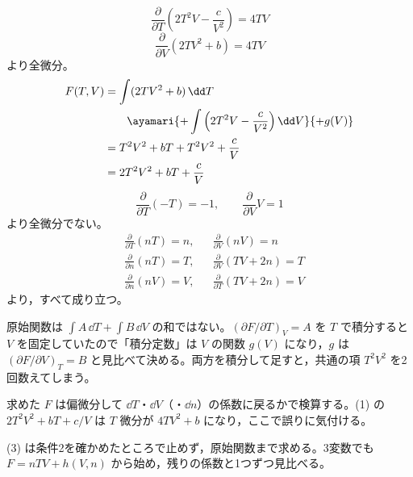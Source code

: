 \[ \frac{\partial}{\partial T}\left(2T^{2}V-\frac{c}{V^{2}}\right)=4TV \]
\[ \frac{\partial}{\partial V}(2TV^{2}+b)=4TV \]
より全微分。
\begin{align*}
F(T,V)&=\int(2TV^{2}+b)\,\dd T\\
&\qquad\ayamari{+\int\left(2T^{2}V-\frac{c}{V^{2}}\right)\dd V}{+g(V)}\\
&=T^{2}V^{2}+bT+T^{2}V^{2}+\frac{c}{V}\\
&=2T^{2}V^{2}+bT+\frac{c}{V}
\end{align*}
\[ \frac{\partial}{\partial T}(-T)=-1, \qquad \frac{\partial}{\partial V}V=1 \]
より全微分でない。
\begin{align*}
&\frac{\partial}{\partial T}(nT)=n, && \frac{\partial}{\partial V}(nV)=n\\
&\frac{\partial}{\partial n}(nT)=T, && \frac{\partial}{\partial V}(TV+2n)=T\\
&\frac{\partial}{\partial n}(nV)=V, && \frac{\partial}{\partial T}(TV+2n)=V
\end{align*}
より，すべて成り立つ。
\item 原始関数は $\int A\,\dd T+\int B\,\dd V$ の和ではない。$(\partial F/\partial T)_{V}=A$ を $T$ で積分すると $V$ を固定していたので「積分定数」は $V$ の関数 $g(V)$ になり，$g$ は $(\partial F/\partial V)_{T}=B$ と見比べて決める。両方を積分して足すと，共通の項 $T^{2}V^{2}$ を2回数えてしまう。
\item 求めた $F$ は偏微分して $\dd T$・$\dd V$（・$\dd n$）の係数に戻るかで検算する。(1) の $2T^{2}V^{2}+bT+c/V$ は $T$ 微分が $4TV^{2}+b$ になり，ここで誤りに気付ける。
\item (3) は条件2を確かめたところで止めず，原始関数まで求める。3変数でも $F=nTV+h(V,n)$ から始め，残りの係数と1つずつ見比べる。
